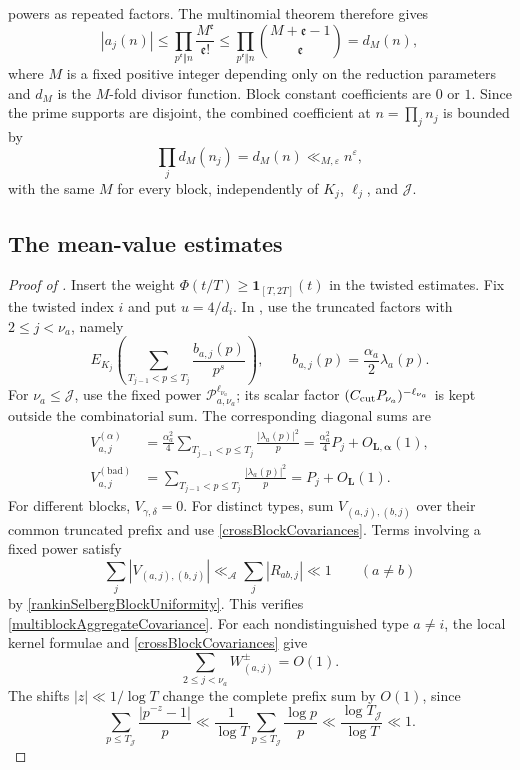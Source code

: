\documentclass[oneside, 12pt]{amsart}
\theoremstyle{definition}
\begin{document}
{		powers as repeated factors. The multinomial theorem therefore gives
		\[
		|a_j(n)|\leq\prod_{p^{\mathfrak e}\Vert n}
		\frac{M^{\mathfrak e}}{\mathfrak e!}
		\leq\prod_{p^{\mathfrak e}\Vert n}
		\binom{M+\mathfrak e-1}{\mathfrak e}=d_M(n),
		\]
		where $M$ is a fixed positive integer depending only on the reduction
		parameters and $d_M$ is the $M$-fold divisor function. Block constant
		coefficients are $0$ or $1$. Since the prime supports are disjoint,
		the combined coefficient at $n=\prod_j n_j$ is bounded by
		\[
		\prod_j d_M(n_j)=d_M(n)\ll_{M,\varepsilon}n^\varepsilon,
		\]
		with the same $M$ for every block, independently of $K_j$, $\ell_j$,
		and $\mathscr J$.
		\subsection{The mean-value estimates}
		
		\begin{proof}[Proof of ]
			Insert the weight $\Phi(t/T)\geq\mathbf1_{[T,2T]}(t)$ in the twisted
			estimates.  Fix the twisted index $i$ and put $u=4/d_i$.
			In , use the truncated factors
			with $2\leq j<\nu_a$, namely
			\[
			E_{K_j}\left(\sum_{T_{j-1}<p\leq T_j}
			\frac{b_{a,j}(p)}{p^s}\right),
			\qquad b_{a,j}(p)=\frac{\alpha_a}{2}\lambda_a(p).
			\]
			For $\nu_a\leq\mathscr J$, use the fixed power
			$\mathcal P_{a,\nu_a}^{\ell_{\nu_a}}$; its scalar factor
			$(C_{\rm cut}P_{\nu_a})^{-\ell_{\nu_a}}$ is kept outside the combinatorial sum.
			The corresponding diagonal sums are
			\begin{align}
				V_{a,j}^{(\alpha)}
				&=\frac{\alpha_a^2}{4}
				\sum_{T_{j-1}<p\leq T_j}\frac{|\lambda_a(p)|^2}{p}
				=\frac{\alpha_a^2}{4}P_j+O_{\boldsymbol L,\boldsymbol\alpha}(1),
				\label{goodBlockVarianceApplication}\\
				V_{a,j}^{(\mathrm{bad})}
				&=\sum_{T_{j-1}<p\leq T_j}
				\frac{|\lambda_a(p)|^2}{p}=P_j+O_{\boldsymbol L}(1).
				\label{badBlockVarianceApplication}
			\end{align}
			For different blocks, $V_{\gamma,\delta}=0$. For distinct types,
			sum $V_{(a,j),(b,j)}$ over their common truncated prefix and
			use \eqref{crossBlockCovariances}.  Terms involving a fixed power satisfy
			\[
			\sum_j|V_{(a,j),(b,j)}|
			\ll_{\mathscr A}\sum_j|R_{ab,j}|\ll1\qquad(a\ne b)
			\]
			by \eqref{rankinSelbergBlockUniformity}.  This verifies
			\eqref{multiblockAggregateCovariance}.
			For each nondistinguished type $a\ne i$, the local kernel formulae and
			\eqref{crossBlockCovariances} give
			\[
			\sum_{2\leq j<\nu_a}W_{(a,j)}^\pm=O(1).
			\]
			The shifts $|z|\ll1/\log T$ change the complete prefix sum by $O(1)$, since
			\[
			\sum_{p\leq T_{\mathscr J}}\frac{|p^{-z}-1|}{p}
			\ll\frac1{\log T}\sum_{p\leq T_{\mathscr J}}\frac{\log p}{p}
			\ll\frac{\log T_{\mathscr J}}{\log T}\ll1.
			\]
			

\end{proof}}
\end{document}
